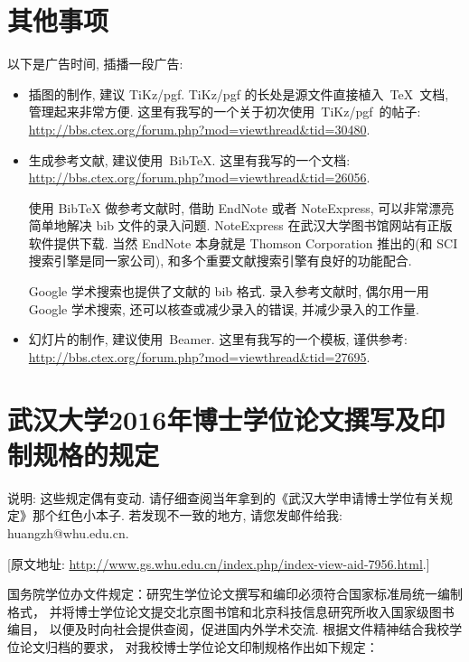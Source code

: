 \documentclass{WHUPhd}  %
\begin{document}
\chapter{其他事项}
以下是广告时间, 插播一段广告:
\begin{itemize}
    \item 插图的制作, 建议 TiKz/pgf.
          TiKz/pgf 的长处是源文件直接植入~\TeX~文档, 管理起来非常方便.
    这里有我写的一个关于初次使用~TiKz/pgf~的帖子:\\    \url{http://bbs.ctex.org/forum.php?mod=viewthread&tid=30480}.
    \item 生成参考文献, 建议使用~BibTeX.  这里有我写的一个文档: \\
    \url{http://bbs.ctex.org/forum.php?mod=viewthread&tid=26056}.

      {\kaishu 使用 BibTeX{} 做参考文献时,
      借助 EndNote 或者 NoteExpress, 可以非常漂亮简单地解决 bib 文件的录入问题.
      NoteExpress 在武汉大学图书馆网站有正版软件提供下载.
      当然 EndNote 本身就是 Thomson Corporation 推出的(和 SCI 搜索引擎是同一家公司),
      和多个重要文献搜索引擎有良好的功能配合.

      Google 学术搜索也提供了文献的 bib 格式.
      录入参考文献时, 偶尔用一用 Google 学术搜索, 还可以核查或减少录入的错误, 并减少录入的工作量.}
     \item 幻灯片的制作, 建议使用~Beamer. 这里有我写的一个模板, 谨供参考:\\
    \url{http://bbs.ctex.org/forum.php?mod=viewthread&tid=27695}.

\end{itemize}

\chapter{武汉大学2016年博士学位论文撰写及印制规格的规定}


{ {\heiti 说明}: \kaishu
 这些规定偶有变动.
 请仔细查阅当年拿到的《武汉大学申请博士学位有关规定》那个红色小本子.
 若发现不一致的地方, 请您发邮件给我: huangzh@whu.edu.cn.}

\bigskip


[原文地址: \url{http://www.gs.whu.edu.cn/index.php/index-view-aid-7956.html}.]
\bigskip

国务院学位办文件规定：研究生学位论文撰写和编印必须符合国家标准局统一编制格式，
并将博士学位论文提交北京图书馆和北京科技信息研究所收入国家级图书编目，
以便及时向社会提供查阅，促进国内外学术交流. 根据文件精神结合我校学位论文归档的要求，
对我校博士学位论文印制规格作出如下规定：
\end{document}
